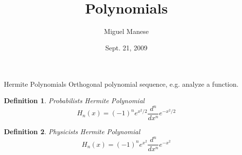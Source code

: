 \documentclass{article}
\title{Polynomials}
\author{Miguel Manese}
\date{Sept. 21, 2009}
\newtheorem{definition}{Definition}
\begin{document}
\maketitle

\begin{section}{Hermite Polynomials}
Orthogonal polynomial sequence, e.g. analyze a function.

\begin{definition}{Probabilists Hermite Polynomial}
\[H_{n}(x) = (-1)^{n}e^{x^{2}/2} \frac{d^{n}}{dx^{n}} e^{-x^2/2} \]
\end{definition}
\begin{definition}{Physicists Hermite Polynomial}
\[H_{n}(x) = (-1)^{n}e^{x^{2}} \frac{d^{n}}{dx^{n}} e^{-x^2} \]
\end{definition}
\end{section}
\end{document}
